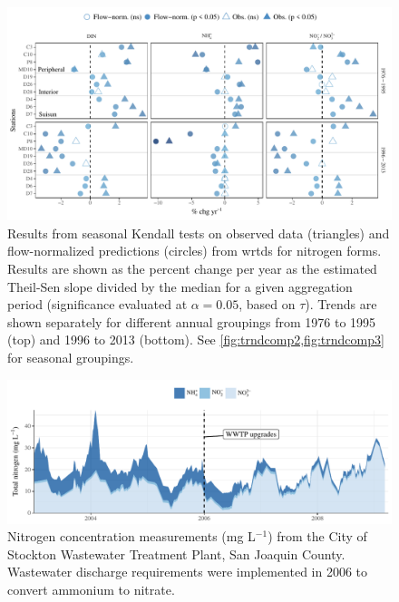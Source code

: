 \documentclass[letterpaper,12pt,oneside]{article}\usepackage[]{graphicx}\usepackage[]{color}
\begin{document}
\begin{figure}
\centering
\includegraphics[width=1\textwidth,page=1]{figs/trndcomp1.pdf}
\caption{Results from seasonal Kendall tests on observed data (triangles) and flow-normalized predictions (circles) from \ac{wrtds} for nitrogen forms. Results are shown as the percent change per year as the estimated Theil-Sen slope divided by the median for a given aggregation period (significance evaluated at $\alpha = 0.05$, based on $\tau$). Trends are shown separately for different annual groupings from 1976 to 1995 (top) and 1996 to 2013 (bottom). See \cref{fig:trndcomp2,fig:trndcomp3} for seasonal groupings.}
\label{fig:trndcomp1}   
\end{figure}

\begin{figure}[!ht]

{\centering \includegraphics[width=\textwidth]{figs/stock-1} 

}

\caption[Nitrogen concentration measurements (mg L$^{-1}$) from the City of Stockton Wastewater Treatment Plant, San Joaquin County]{Nitrogen concentration measurements (mg L$^{-1}$) from the City of Stockton Wastewater Treatment Plant, San Joaquin County.  Wastewater discharge requirements were implemented in 2006 to convert ammonium to nitrate.}\label{fig:stock}
\end{figure}
\end{document}
